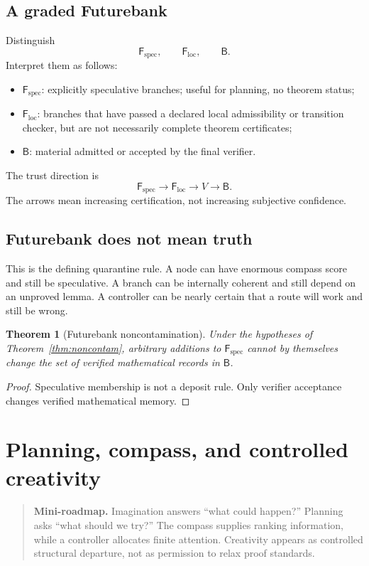 \documentclass[11pt,openany]{book}
\newtheorem{theorem}{Theorem}[chapter]
\theoremstyle{definition}
\theoremstyle{remark}
\newenvironment{miniroadmap}{\begin{quote}\small\color{deepblue}\textbf{Mini-roadmap.} }{\end{quote}}
\newcommand{\Bank}{\mathsf{B}}
\newcommand{\Future}{\mathsf{F}}
\newcommand{\Spec}{\Future_{\mathrm{spec}}}
\newcommand{\Loc}{\Future_{\mathrm{loc}}}
\begin{document}
\section{A graded Futurebank}
Distinguish
\[
\Spec,\qquad \Loc,\qquad \Bank.
\]
Interpret them as follows:
\begin{itemize}
\item $\Spec$: explicitly speculative branches; useful for planning, no theorem status;
\item $\Loc$: branches that have passed a declared local admissibility or transition checker, but are not necessarily complete theorem certificates;
\item $\Bank$: material admitted or accepted by the final verifier.
\end{itemize}
The trust direction is
\[
\Spec\longrightarrow\Loc\longrightarrow V\longrightarrow\Bank.
\]
The arrows mean increasing certification, not increasing subjective confidence.

\section{Futurebank does not mean truth}
This is the defining quarantine rule. A node can have enormous compass score and still be speculative. A branch can be internally coherent and still depend on an unproved lemma. A controller can be nearly certain that a route will work and still be wrong.

\begin{theorem}[Futurebank noncontamination]
Under the hypotheses of Theorem~\ref{thm:noncontam}, arbitrary additions to $\Spec$ cannot by themselves change the set of verified mathematical records in $\Bank$.
\end{theorem}
\begin{proof}
Speculative membership is not a deposit rule. Only verifier acceptance changes verified mathematical memory.
\end{proof}

\chapter{Planning, compass, and controlled creativity}
\begin{miniroadmap}
Imagination answers ``what could happen?'' Planning asks ``what should we try?'' The compass supplies ranking information, while a controller allocates finite attention. Creativity appears as controlled structural departure, not as permission to relax proof standards.
\end{miniroadmap}
\end{document}
